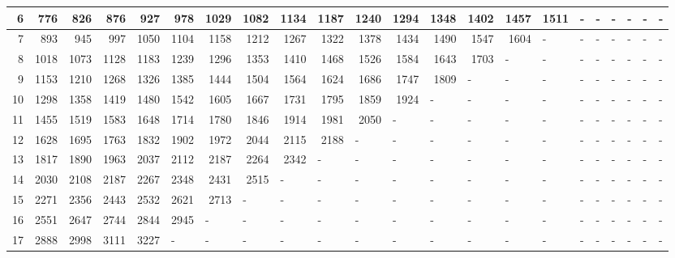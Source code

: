 \begin{appendices}
\begin{table}[H]
\begin{minipage}[b]{18.5cm}
\begin{turn}{90}
{\begin{tabular}{|r|r|r|r|r|r|r|r|r|r|r|r|l|l|l|l|l|l|l|l|l|l|}
6 & 776 & 826 & 876 & 927 & 978 & 1029 & 1082 & 1134 & 1187 & 1240 & 1294 & \multicolumn{1}{r|}{1348} & \multicolumn{1}{r|}{1402} & \multicolumn{1}{r|}{1457} & \multicolumn{1}{r|}{1511} & - & - & - & - & - & - \\ \hline
7 & 893 & 945 & 997 & 1050 & 1104 & 1158 & 1212 & 1267 & 1322 & 1378 & 1434 & \multicolumn{1}{r|}{1490} & \multicolumn{1}{r|}{1547} & \multicolumn{1}{r|}{1604} & - & - & - & - & - & - & - \\ \hline
8 & 1018 & 1073 & 1128 & 1183 & 1239 & 1296 & 1353 & 1410 & 1468 & 1526 & 1584 & \multicolumn{1}{r|}{1643} & \multicolumn{1}{r|}{1703} & - & - & - & - & - & - & - & - \\ \hline
9 & 1153 & 1210 & 1268 & 1326 & 1385 & 1444 & 1504 & 1564 & 1624 & 1686 & 1747 & \multicolumn{1}{r|}{1809} & - & - & - & - & - & - & - & - & - \\ \hline
10 & 1298 & 1358 & 1419 & 1480 & 1542 & 1605 & 1667 & 1731 & 1795 & 1859 & 1924 & - & - & - & - & - & - & - & - & - & - \\ \hline
11 & 1455 & 1519 & 1583 & 1648 & 1714 & 1780 & 1846 & 1914 & 1981 & 2050 & \multicolumn{1}{l|}{-} & - & - & - & - & - & - & - & - & - & - \\ \hline
12 & 1628 & 1695 & 1763 & 1832 & 1902 & 1972 & 2044 & 2115 & 2188 & \multicolumn{1}{l|}{-} & \multicolumn{1}{l|}{-} & - & - & - & - & - & - & - & - & - & - \\ \hline
13 & 1817 & 1890 & 1963 & 2037 & 2112 & 2187 & 2264 & 2342 & \multicolumn{1}{l|}{-} & \multicolumn{1}{l|}{-} & \multicolumn{1}{l|}{-} & - & - & - & - & - & - & - & - & - & - \\ \hline
14 & 2030 & 2108 & 2187 & 2267 & 2348 & 2431 & 2515 & \multicolumn{1}{l|}{-} & \multicolumn{1}{l|}{-} & \multicolumn{1}{l|}{-} & \multicolumn{1}{l|}{-} & - & - & - & - & - & - & - & - & - & - \\ \hline
15 & 2271 & 2356 & 2443 & 2532 & 2621 & 2713 & \multicolumn{1}{l|}{-} & \multicolumn{1}{l|}{-} & \multicolumn{1}{l|}{-} & \multicolumn{1}{l|}{-} & \multicolumn{1}{l|}{-} & - & - & - & - & - & - & - & - & - & - \\ \hline
16 & 2551 & 2647 & 2744 & 2844 & 2945 & \multicolumn{1}{l|}{-} & \multicolumn{1}{l|}{-} & \multicolumn{1}{l|}{-} & \multicolumn{1}{l|}{-} & \multicolumn{1}{l|}{-} & \multicolumn{1}{l|}{-} & - & - & - & - & - & - & - & - & - & - \\ \hline
17 & 2888 & 2998 & 3111 & 3227 & \multicolumn{1}{l|}{-} & \multicolumn{1}{l|}{-} & \multicolumn{1}{l|}{-} & \multicolumn{1}{l|}{-} & \multicolumn{1}{l|}{-} & \multicolumn{1}{l|}{-} & \multicolumn{1}{l|}{-} & - & - & - & - & - & - & - & - & - & - \\ \hline

\end{tabular}}
\end{turn}
\end{minipage}
\end{table}
\end{appendices}
